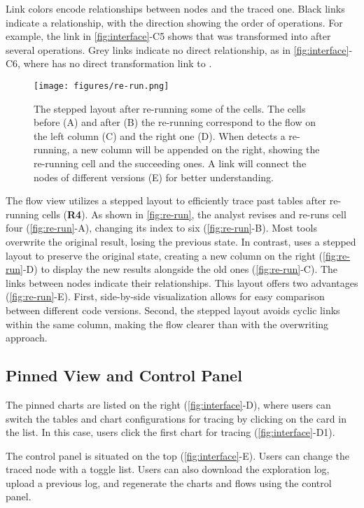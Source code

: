 Link colors encode relationships between nodes and the traced one. Black links indicate a relationship, with the direction showing the order of operations. For example, the link in \autoref{fig:interface}-C5 shows that  was transformed into  after several operations. Grey links indicate no direct relationship, as in \autoref{fig:interface}-C6, where  has no direct transformation link to .

\begin{figure*}[!htb]
    \centering
    \texttt{[image: figures/re-run.png]}
    \caption{The stepped layout after re-running some of the cells. The cells before (A) and after (B) the re-running correspond to the flow on the left column (C) and the right one (D). When \system{} detects a re-running, a new column will be appended on the right, showing the re-running cell and the succeeding ones. A link will connect the nodes of different versions (E) for better understanding.}
    \label{fig:re-run}
\end{figure*}

The flow view utilizes a stepped layout to efficiently trace past tables after re-running cells (\textbf{R4}). As shown in \autoref{fig:re-run}, the analyst revises and re-runs cell four (\autoref{fig:re-run}-A), changing its index to six (\autoref{fig:re-run}-B). Most tools overwrite the original result, losing the previous state. In contrast, \system{} uses a stepped layout to preserve the original state, creating a new column on the right (\autoref{fig:re-run}-D) to display the new results alongside the old ones (\autoref{fig:re-run}-C). The links between nodes indicate their relationships.
This layout offers two advantages (\autoref{fig:re-run}-E). First, side-by-side visualization allows for easy comparison between different code versions. Second, the stepped layout avoids cyclic links within the same column, making the flow clearer than with the overwriting approach.

\subsection{Pinned View and Control Panel}
The pinned charts are listed on the right (\autoref{fig:interface}-D), where users can switch the tables and chart configurations for tracing by clicking on the card in the list.
In this case, users click the first chart for tracing (\autoref{fig:interface}-D1).

The control panel is situated on the top (\autoref{fig:interface}-E).
Users can change the traced node with a toggle list.
Users can also download the exploration log, upload a previous log, and regenerate the charts and flows using the control panel.
